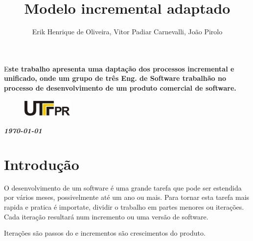 \documentclass[	DIV=calc,%
							paper=a4,%
							fontsize=12pt,%
							onecolumn]{scrartcl}	 					%
\title{Modelo incremental adaptado }					%
\author{Erik Henrique de Oliveira, Vitor Padiar Carnevalli, João Pirolo }  	%
\date{}																				%
\newcommand{\initial}[1]{%
     \lettrine[lines=3,lhang=0.3,nindent=0em]{
     				\color{DarkGoldenrod}
     				{\textsf{#1}}}{}}
\begin{document}
\maketitle
\thispagestyle{fancy} 	
\thispagestyle{empty}		%




\initial{E}\textbf{ste trabalho apresenta uma daptação dos processos incremental e unificado, onde um grupo de três Eng. de Software trabalhão no processo de desenvolvimento de um produto comercial de software. } 

\begin{figure}
	\centering
	\includegraphics{utfpr}
\end{figure}

\vspace{3cm}
\centerline{\textit{\textbf{\today}}}

\clearpage
    \renewcommand*\listfigurename{Lista de figuras}
\listoffigures

\renewcommand*\listtablename{Lista de tabelas}
\listoftables




\clearpage
\renewcommand{\contentsname}{Sumário}
\tableofcontents
\clearpage

\section{Introdução}

O desenvolvimento de um software é uma grande tarefa que pode ser estendida por vários meses, possivelmente até um ano ou mais. Para tornar esta tarefa mais rapida e pratica é importate, dividir o trabalho em partes menores ou iterações. Cada iteração resultará num incremento ou uma versão de software. 

 Iterações são passos do e incrementos são crescimentos do produto.
\end{document}
